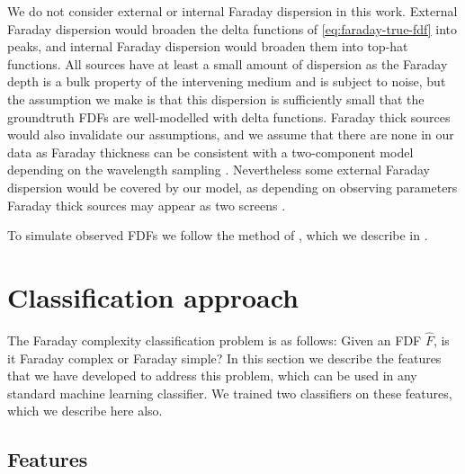     We do not consider external or internal Faraday dispersion in this work. External Faraday dispersion would broaden the delta functions of \autoref{eq:faraday-true-fdf} into peaks, and internal Faraday dispersion would broaden them into top-hat functions. All sources have at least a small amount of dispersion as the Faraday depth is a bulk property of the intervening medium and is subject to noise, but the assumption we make is that this dispersion is sufficiently small that the groundtruth FDFs are well-modelled with delta functions. Faraday thick sources would also invalidate our assumptions, and we assume that there are none in our data as Faraday thickness can be consistent with a two-component model depending on the wavelength sampling \citep[e.g.][]{ma_broad-band_2019,brentjens_faraday_2005}. Nevertheless some external Faraday dispersion would be covered by our model, as depending on observing parameters Faraday thick sources may appear as two screens \citep{van_eck_faraday_2017}.

    To simulate observed FDFs we follow the method of \citet{brown_classifying_2018}, which we describe in .

\section{Classification approach}
\label{sec:faraday-approach}

  The Faraday complexity classification problem is as follows: Given an FDF $\hat F$, is it Faraday complex or Faraday simple? In this section we describe the features that we have developed to address this problem, which can be used in any standard machine learning classifier. We trained two classifiers on these features, which we describe here also.

  \subsection{Features}
  \label{sec:faraday-scores-method}

